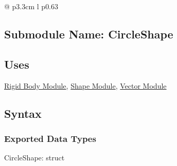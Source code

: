 \documentclass[12pt]{article}
\newcommand{\colDescrip}{0.63\textwidth}
\newcommand{\newfunc}{\\[1.5em]}
\newcommand{\Body}{\hyperref[MISBody]{Rigid Body Module}}
\newcommand{\Shape}{\hyperref[MISShape]{Shape Module}}
\newcommand{\Vector}{\hyperref[MISVector]{Vector Module}}
\begin{document}
\begin{longtable*}{@{} p{3.3cm} l p{\colDescrip}}
%		
	\end{longtable*}

\subsection{Submodule Name: CircleShape} \label{MISCircle}


\subsection{Uses} \label{SecUCircle}
	\Body, \Shape, \Vector

\subsection{Syntax}

\subsubsection{Exported Data Types} \label{SecEDTCircle}
	CircleShape: struct
\end{document}
